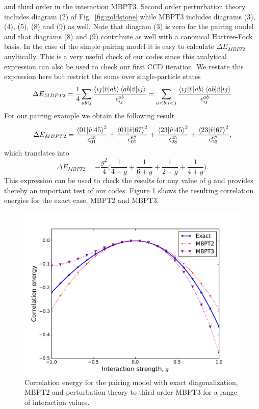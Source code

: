 and third order in the interaction MBPT3. Second order perturbation theory includes diagram (2) of Fig.~\ref{fig:goldstone}
while MBPT3 includes diagrams (3), (4), (5), (8) and (9) as well. Note that diagram (3) is zero for the pairing model and that diagrams (8) and (9) contribute as well with a canonical Hartree-Fock basis. 
  In the case of the simple pairing model it is easy to calculate
  $\Delta E_{MBPT2}$ anyltically. This is a very useful  check of our codes since this analytical expression  can  also be used to check our first CCD iteration.
We restate this expression here but restrict the sums over single-particle states
  \[
  \Delta E_{MBPT2} = \frac{1}{4} \sum_{abij} \frac{\braket{ij|\hat{v}|ab}
    \braket{ab|\hat{v}|ij}}{ \epsilon_{ij}^{ab}} = \sum_{a<b,i<j}
  \frac{\braket{ij|\hat{v}|ab} \braket{ab|\hat{v}|ij}}{ \epsilon_{ij}^{ab}}
  \]
  For our pairing example we obtain the following result
  \[
  \Delta E_{MBPT2} = \frac{\braket{01|\hat{v}|45}^2}{\epsilon_{01}^{45}} +
  \frac{\braket{01|\hat{v}|67}^2}{\epsilon_{01}^{67}} +
  \frac{\braket{23|\hat{v}|45}^2}{\epsilon_{23}^{45}} +
  \frac{\braket{23|\hat{v}|67}^2}{\epsilon_{23}^{67}},
  \]
which translates into
  \[
  \Delta E_{MBPT2} = -\frac{g^2}{4} \bigg( \frac{1}{ 4 + g} +
  \frac{1}{ 6 + g} + \frac{1}{ 2 + g} + \frac{1}{ 4 + g} \bigg).
  \]
 This expression can be used to check the results
  for any value of $g$ and provides thereby an important test of  our codes.
Figure \ref{fig:diagpairing} shows the resulting correlation energies for the exact case, MBPT2 and MBPT3.
  \begin{figure}
    \includegraphics[width=\linewidth]{Chapter8-figures/perturbationtheory.pdf}
    \caption{Correlation energy for the pairing model with exact diagonalization, MBPT2 and perturbation theory to third order MBPT3 for a range of interaction values.}
    \label{fig:diagpairing}
  \end{figure}
